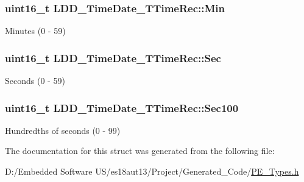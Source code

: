 \subsubsection[{Min}]{\setlength{\rightskip}{0pt plus 5cm}uint16\+\_\+t L\+D\+D\+\_\+\+Time\+Date\+\_\+\+T\+Time\+Rec\+::\+Min}\label{struct_l_d_d___time_date___t_time_rec_a7cea2c409e90bccdc33f19b093020373}
Minutes (0 -\/ 59) \hypertarget{struct_l_d_d___time_date___t_time_rec_a05cccc86e89e5704b0460caaf2429f75}{}
\subsubsection[{Sec}]{\setlength{\rightskip}{0pt plus 5cm}uint16\+\_\+t L\+D\+D\+\_\+\+Time\+Date\+\_\+\+T\+Time\+Rec\+::\+Sec}\label{struct_l_d_d___time_date___t_time_rec_a05cccc86e89e5704b0460caaf2429f75}
Seconds (0 -\/ 59) \hypertarget{struct_l_d_d___time_date___t_time_rec_a2cd2e13e7c478f04ea1c4c460b104491}{}
\subsubsection[{Sec100}]{\setlength{\rightskip}{0pt plus 5cm}uint16\+\_\+t L\+D\+D\+\_\+\+Time\+Date\+\_\+\+T\+Time\+Rec\+::\+Sec100}\label{struct_l_d_d___time_date___t_time_rec_a2cd2e13e7c478f04ea1c4c460b104491}
Hundredths of seconds (0 -\/ 99) 

The documentation for this struct was generated from the following file\+:\begin{DoxyCompactItemize}
\item 
D\+:/\+Embedded Software U\+S/es18aut13/\+Project/\+Generated\+\_\+\+Code/\hyperlink{_p_e___types_8h}{P\+E\+\_\+\+Types.\+h}\end{DoxyCompactItemize}
